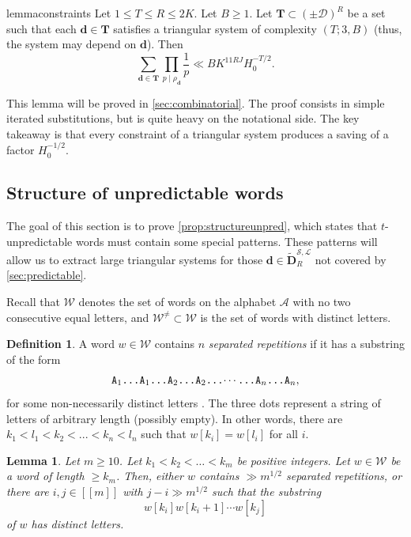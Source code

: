 \documentclass[11pt]{amsart}
\newtheorem{lemma}[theorem]{Lemma}
\theoremstyle{definition}
\newtheorem{definition}[theorem]{Definition}
\renewcommand{\leq}{\leqslant}
\renewcommand{\geq}{\geqslant}
\newcommand{\sinterval}[1]{[\![#1]\!] }
\newcommand{\D}{\mathcal{D}}
\renewcommand{\d}{\boldsymbol{d}}
\newcommand{\upletters}[1]{{\normalfont{\texttt{#1}}}}
\newcommand{\makesubscript}[1]{\textsubscript{$#1$}}
\newcommand{\fprod}[1]{\rho_{#1}}
\newcommand{\pall}{\fprod{\d}}
\newcommand{\word}{\mathcal{W}}
\newcommand{\lit}{\mathcal{L}}
\newcommand{\s}{\mathcal{S}}
\newcommand{\fancyD}{\mathbf{D}}
\newcommand{\Dnb}{\widetilde{\fancyD}^{\s,\lit}_{\!\tupsize}}
\newcommand{\XX}{\mathbf{T}}
\newcommand{\repR}{J}
\newcommand{\repK}{K}
\newcommand{\tupsize}{R}
\newcommand{\ncond}{T}
\newcommand{\thisM}{m}
\begin{document}
\begin{restatable}{lemma}{constraints}
\label{lem:constraints}
Let $1\leq \ncond \leq \tupsize\leq 2 \repK$. Let $B\geq 1$. Let $\XX\subset (\pm \D)^{\tupsize}$ be a set such that each $\d \in \XX$ satisfies a triangular system of complexity $(T; 3, B)$ (thus, the system may depend on $\d$). Then 
\begin{equation*}
	\sum_{\d\in \XX} \prod_{p\mid \pall} \frac1p \ll B \repK^{11\tupsize \repR} H_0^{-\ncond/2}.
\end{equation*}
\end{restatable}

This lemma will be proved in \cref{sec:combinatorial}. The proof consists in simple iterated substitutions, but is quite heavy on the notational side. The key takeaway is that every constraint of a triangular system produces a saving of a factor $H_0^{-1/2}$.



\subsection{Structure of unpredictable words}
The goal of this section is to prove \cref{prop:structureunpred}, which states that $t$-unpredictable words must contain some special patterns. These patterns will allow us to extract large triangular systems for those $\d\in \Dnb$ not covered by \cref{sec:predictable}.

Recall that $\word$ denotes the set of words on the alphabet $\mathcal{A}$ with no two consecutive equal letters, and $\word^{\neq}\subset \word$ is the set of words with distinct letters.

\begin{definition}
\label{def:repetitions}
A word $w\in \word$ contains $n$ \emph{separated repetitions} if it has a substring of the form
\begin{equation*}
\upletters{A\makesubscript{1}\ldots A\makesubscript{1}\ldots A\makesubscript{2}\ldots A\makesubscript{2}\ldots$\cdots$\ldots A\makesubscript{n}\ldots A\makesubscript{n}},
\end{equation*}
for some non-necessarily distinct letters \upletters{A\makesubscript{1}$,\ldots,$A\makesubscript{n}}. The three dots \upletters{\ldots} represent a string of letters of arbitrary length (possibly empty). In other words, there are $k_1<l_1<k_2<...<k_n<l_n$ such that $w[k_i]=w[l_i]$ for all $i$.
\end{definition}

\begin{lemma}
\label{lem:unpredstep0}
Let $\thisM \geq 10$. Let $k_1<k_2<\ldots<k_{\thisM}$ be positive integers. Let $w\in \word$ be a word of length $\geq k_{\thisM}$. Then, either $w$ contains $\gg \thisM^{1/2}$ separated repetitions, or there are $i,j\in \sinterval{\thisM}$ with $j-i \gg \thisM^{1/2}$ such that the substring 
\begin{equation*}
	w[k_i]w[k_{i}+1] \cdots w[k_j]
\end{equation*}
of $w$ has distinct letters.
\end{lemma}
\end{document}
